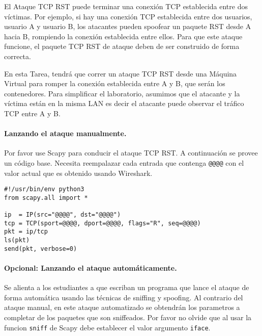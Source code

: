 El Ataque TCP RST puede terminar una conexión TCP establecida entre dos víctimas. Por ejemplo, si hay una conexión TCP \telnet establecida entre dos usuarios, usuario A y usuario B, los atacantes pueden spoofear un paquete RST desde A hacia B, rompiendo la conexión establecida entre ellos. Para que este ataque funcione, el paquete TCP RST de ataque deben de ser construido de forma correcta.

En esta Tarea, tendrá que correr un ataque TCP RST desde una Máquina Virtual para romper la conexión \telnet establecida entre A y B, que serán los contenedores. Para simplificar el laboratorio, asumimos que el atacante y la víctima están en la misma LAN es decir el atacante puede observar el tráfico TCP entre A y B.


\paragraph{Lanzando el ataque manualmente.} 
Por favor use Scapy para conducir el ataque TCP RST.
A continuación se provee un código base. Necesita reempalazar cada entrada que contenga \texttt{@@@@} con el valor actual que es obtenido usando Wireshark.

\begin{lstlisting}
#!/usr/bin/env python3
from scapy.all import *

ip  = IP(src="@@@@", dst="@@@@")
tcp = TCP(sport=@@@@, dport=@@@@, flags="R", seq=@@@@)
pkt = ip/tcp
ls(pkt)
send(pkt, verbose=0)
\end{lstlisting}

\paragraph{Opcional: Lanzando el ataque automáticamente.} 
Se alienta a los estudiantes a que escriban un programa que lance el ataque de forma automática usando las técnicas de sniffing y spoofing. Al contrario del ataque manual, en este ataque automatizado se obtendrán los parametros a completar de los paquetes que son sniffeados.
Por favor no olvide que al usar la funcion \texttt{sniff} de Scapy debe establecer el valor argumento \texttt{iface}.

 

